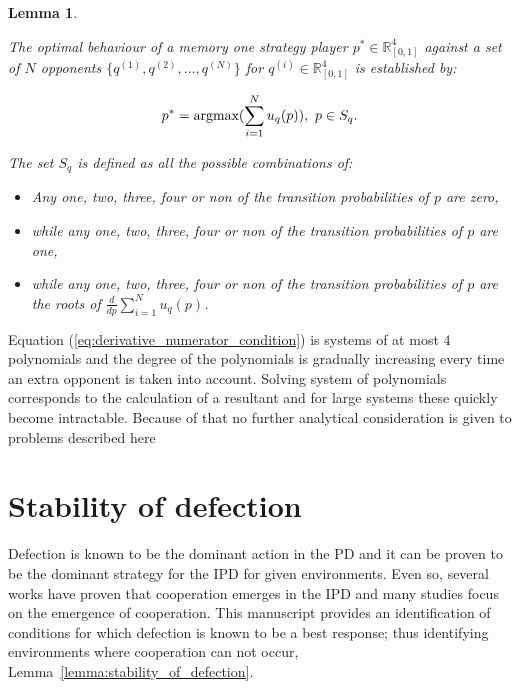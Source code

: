 \documentclass[10pt]{article}
\newcommand{\R}{\mathbb{R}}
\newtheorem{lemma}[theorem]{Lemma}
\begin{document}
\begin{lemma}\label{lemma:memone_group_best_response}

    The optimal behaviour of a memory one strategy player
    \(p^* \in \R_{[0, 1]} ^ 4\)
    against a set of \(N\) opponents \(\{q^{(1)}, q^{(2)}, \dots, q^{(N)} \}\)
    for \(q^{(i)} \in \R_{[0, 1]} ^ 4\) is established by:

    \[p^* = \textnormal{argmax}(\sum\limits_{i=1} ^ N  u_q(p)), \ p \in S_q.\]

    The set \(S_q\) is defined as all the possible combinations of:

    \begin{itemize}
    \item Any one, two, three, four or non of the transition probabilities of
    \(p\) are zero,
    \item while any one, two, three, four or non of the transition probabilities of
    \(p\) are one,
    \item while any one, two, three, four or non of the transition probabilities of
    \(p\) are the roots of \(\frac{d}{dp} \sum\limits_{i=1} ^ N  u_q(p)\).
    \end{itemize}

\end{lemma}

Equation (\ref{eq:derivative_numerator_condition}) is systems of at most \(4\)
polynomials and the degree of the polynomials is gradually increasing every time
an extra opponent is taken into account.
Solving system of polynomials corresponds to the calculation of a resultant and
for large systems these quickly become intractable.
Because of that no further analytical consideration is given to problems
described here

\section{Stability of defection}

Defection is known to be the dominant action in the PD and it can be proven to
be the dominant strategy for the IPD for given environments. Even so, several
works have proven that cooperation emerges in the IPD and many studies focus on
the emergence of cooperation. This manuscript provides an identification of
conditions for which defection is known to be a best response; thus identifying
environments where cooperation can not occur, Lemma~\ref{lemma:stability_of_defection}.
\end{document}
